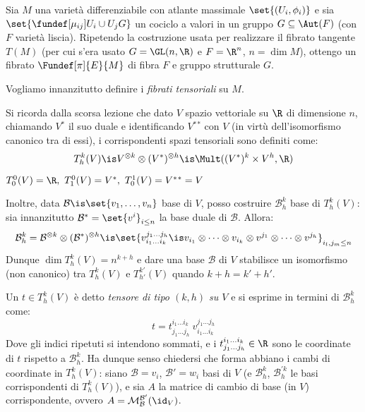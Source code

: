 

\newcommand*\Ps{\mathbb{P}} %
\newcommand*\tc{\ \text{t.c.} \ } %
\newcommand*\dual{{^\ast}} %
\newcommand*\base[1][B]{\mathcal{#1}} %


Sia $M$ una varietà differenziabile con atlante massimale $\set{(U_i, \phi_i)}$
e sia $\set{ \fundef[\mu_{ij}]{U_i \cup U_j}{G} }$ un cociclo a valori in un gruppo $G \subseteq \Aut(F)$ (con $F$ varietà liscia). Ripetendo la costruzione usata per realizzare il fibrato tangente $T(M)$ (per cui s'era usato $G = \GL(n, \R)$ e $F=\R^n$, $n = \dim M$), ottengo un fibrato $\Fundef[\pi]{E}{M}$ di fibra $F$ e gruppo strutturale $G$.


Vogliamo innanzitutto definire i \emph{fibrati tensoriali} su $M$.

Si ricorda dalla scorsa lezione che dato $V$ spazio vettoriale su $\R$ di dimensione $n$, chiamando $V\dual$ il suo duale e identificando $V \dual \dual$ con $V$ (in virtù dell'isomorfismo canonico tra di essi), i corrispondenti spazi tensoriali sono definiti come: \[
T_h^k(V) \is V^{\otimes k} \otimes (V \dual)^{\otimes h} \is \Mult( (V\dual)^k \times V^h, \R)  \]
\begin{oss}
	$ T_0^0(V) = \R, \ T_1^0(V) = V \dual, \ T_0^1(V) = V \dual \dual = V $
\end{oss}	
Inoltre, data $\base \is \set{v_1, \dots, v_n}$ base di $V$, posso costruire $\base_h^k$ base di $T_h^k(V)$: sia innanzitutto $\base \dual = \set{v^i}_{i \leq n}$ la base duale di $\base$. Allora: \[
\base_h^k = \base ^{\otimes k} \otimes (\base \dual)^{\otimes h} \is
\set{v^{j_1 \dots j_h}_{i_1 \dots i_k} \is v_{i_1} \otimes \dots \otimes v_{i_k} \otimes v^{j_1} \otimes \dots \otimes v^{j_h} } _{i_l, j_m \leq n} \]
Dunque $\dim T_h^k(V) = n^{k+h}$ e dare una base $\base$ di $V$ stabilisce un isomorfismo (non canonico) tra $T_h^k(V)$ e $T_{h'}^{k'}(V)$ quando $k+h = k'+h'$.

Un $t \in T_h^k(V)$ è detto \emph{tensore di tipo $(k, h)$ su $V$} e si esprime in termini di $\base_h^k$ come: \[
t = t_{j_1 \dots j_h}^{i_1 \dots i_k} \  v^{j_1 \dots j_h}_{i_1 \dots i_k} \]
Dove gli indici ripetuti si intendono sommati, e i $t_{j_1 \dots j_h}^{i_1 \dots i_k} \in \R$ sono le coordinate di $t$ rispetto a $\base_h^k$. Ha dunque senso chiedersi che forma abbiano i cambi di coordinate in $T^k_h(V)$: siano $\base={v_i}$, $\base'={w_i}$ basi di $V$ (e $\base_h^k$, $\base_h^{\prime k}$ le basi corrispondenti di $T^k_h(V)$), e sia $A$ la matrice di cambio di base (in $V$) corrispondente, ovvero $A = \mathcal{M}_{\base}^{\base'}(\id_V)$.

